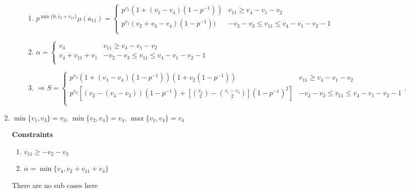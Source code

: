 \documentclass{article}
\begin{document}
\begin{enumerate}
\begin{enumerate}
        \begin{enumerate}
            \item $p^{\min\{0,v_2+v_{11}\}}\mu(a_{11})=
            \left\{
	\begin{array}{ll}
            p^{v_2}(1+(v_1-v_4)(1-p^{-1})) & v_{11}\geq{v_4-v_1-v_2} \\
		  p^{v_2}(v_2+v_3-v_4)(1-p^{-1})) & -v_2-v_3\leq{v_{11}}\leq{v_4-v_1-v_2-1} \\
	\end{array}
\right.
$
            \item $\alpha=\left\{
	\begin{array}{ll}
            v_4  & v_{11}\geq{v_4-v_1-v_2} \\
		  v_4+v_{11}+v_1 & -v_2-v_3\leq{v_{11}}\leq{v_4-v_1-v_2-1} \\
	\end{array}
\right.$
        \item $\Rightarrow{S=\left\{
	\begin{array}{ll}
            p^{v_2}(1+(v_1-v_4)(1-p^{-1}))(1+v_2(1-p^{-1}))  & v_{11}\geq{v_4-v_1-v_2} \\
		              p^{v_2}[(v_2-(v_4-v_3))(1-p^{-1})+[\binom{v_4}{2}-\binom{v_1-v_3}{2}](1-p^{-1})^2]  & -v_2-v_3\leq{v_{11}}\leq{v_4-v_1-v_2-1} \\
	\end{array}
\right.}.$
        \end{enumerate}

    \end{enumerate}

    \item $\min\{v_1,v_3\}=v_3$, $\min\{v_2,v_4\}=v_4$, $\max\{v_1,v_4\}=v_4$
    
    \textbf{Constraints}
    \begin{enumerate}
        \item $v_{11}\geq{-v_2-v_3}$
        \item $\alpha=\min\{v_4,v_2+v_{11}+v_4\}$
    \end{enumerate}
    There are no sub cases here 


\end{enumerate}
\end{document}

